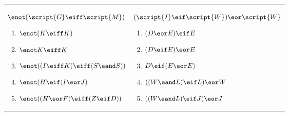 \begin{exercises}
\begin{longtabu}{p{2.5in}p{2.5in}}
\\
\item $ \enot (\script{G} \eiff \script{M}) $ 
\begin{flushleft} 	
\begin{enumerate}[label=\alph*.]
\item 	$\enot (K \eiff K) $
\item 	$\enot K \eiff K$
\item 	$\enot ((I \eiff K) \eiff (S \eand S)) $
\item 	$\enot (H \eif (I \eor J)$
\item 	$\enot ((H \eor F)  \eiff (Z \eif D) ) $
\end{enumerate}
\end{flushleft}
&
\item $ (\script{I} \eif \script{W}) \eor \script{W} $ 
\begin{flushleft} 	
\begin{enumerate}[label=\alph*.]
\item 	$(D \eor E) \eif E$
\item 	$(D \eif E) \eor E$
\item 	$ D \eif (E \eor E)	$
\item 	$ ((W \eand L) \eif L) \eor W$
\item 	$((W \eand L) \eif J) \eor J$
\end{enumerate}
\end{flushleft}

\\


\end{longtabu}
\end{exercises}
